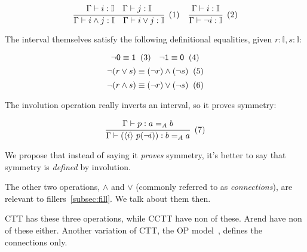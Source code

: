\[
  \cfrac{
    \Gamma \vdash i : \mathbb I
    \quad
    \Gamma \vdash j : \mathbb I
  }{
    \Gamma \vdash i \wedge j : \mathbb I
    \quad
    \Gamma \vdash i \vee j : \mathbb I
  }
  \xtag
  \quad
  \cfrac{
    \Gamma \vdash i : \mathbb I
  }{
    \Gamma \vdash \neg i : \mathbb I
  }
  \xtag
\]

The interval themselves satisfy the following definitional equalities,
given $r : \mathbb I, s : \mathbb I$:

\[
  \neg \textsf 0 \equiv \textsf 1 \xtag \quad
  \neg \textsf 1 \equiv \textsf 0 \xtag
\]
\[
  \neg (r \vee s) \equiv (\neg r) \wedge (\neg s) \xtag
\]
\[
  \neg (r \wedge s) \equiv (\neg r) \vee (\neg s) \xtag
\]

The involution operation really inverts an interval, so it proves symmetry:

\[
  \cfrac{
    \Gamma \vdash p : a =_A b
  }{
    \Gamma \vdash (\lrangle i~p (\neg i)) : b =_A a
  } \xtag
\]

We propose that instead of saying it \textit{proves} symmetry,
it's better to say that symmetry is \textit{defined} by involution.

The other two operations, $\wedge$ and $\vee$
(commonly referred to as \textit{connections}),
are relevant to fillers~\cref{subsec:fill}.
We talk about them then.

CTT has these three operations, while CCTT have non of these.
Arend have non of these either.
Another variation of CTT,
the OP model~\cite{OPModel}, defines the connections only.

